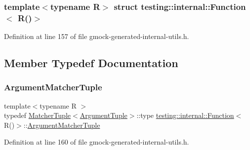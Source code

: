 \subsubsection*{template$<$typename R$>$\newline
struct testing\+::internal\+::\+Function$<$ R()$>$}



Definition at line 157 of file gmock-\/generated-\/internal-\/utils.\+h.



\subsection{Member Typedef Documentation}
\mbox{\label{structtesting_1_1internal_1_1Function_3_01R_07_08_4_a9bec5cf8937e8af99dedab2f40129fab}} 
\subsubsection{\texorpdfstring{Argument\+Matcher\+Tuple}{ArgumentMatcherTuple}}
{\footnotesize\ttfamily template$<$typename R $>$ \\
typedef \hyperlink{structtesting_1_1internal_1_1MatcherTuple}{Matcher\+Tuple}$<$\hyperlink{structtesting_1_1internal_1_1Function_3_01R_07_08_4_ad483c3128c470d8cdb55c3ac1c575c11}{Argument\+Tuple}$>$\+::type \hyperlink{structtesting_1_1internal_1_1Function}{testing\+::internal\+::\+Function}$<$ R()$>$\+::\hyperlink{structtesting_1_1internal_1_1Function_3_01R_07_08_4_a9bec5cf8937e8af99dedab2f40129fab}{Argument\+Matcher\+Tuple}}



Definition at line 160 of file gmock-\/generated-\/internal-\/utils.\+h.

\mbox{\label{structtesting_1_1internal_1_1Function_3_01R_07_08_4_ad483c3128c470d8cdb55c3ac1c575c11}} 

